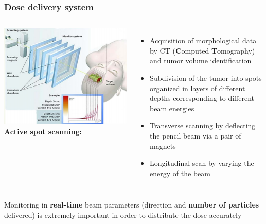 \documentclass[aspectratio=169]{beamer}
\begin{document}
	\begin{frame}
		\frametitle{Dose delivery system}
		\begin{columns}
			\includegraphics[width=0.95 \textwidth]{IMG/Beam_Monitoring.PNG}
			{\color{blue} \textbf{Active spot scanning:}}
			\begin{itemize}
				\item Acquisition of morphological data by CT (\textbf{C}omputed \textbf{T}omography) and tumor volume identification
				\item Subdivision of the tumor into spots organized in layers of different depths corresponding to different beam energies
				\item Transverse scanning by deflecting the pencil beam via a pair of magnets
				\item Longitudinal scan by varying the energy of the beam
			\end{itemize}
		\end{columns}
	\vspace{0.5 cm}
	{\color{blue} Monitoring in \textbf{real-time} beam parameters (direction and \textbf{number of particles} delivered) \newline is extremely important in order to distribute the dose accurately}
	\end{frame}
\end{document}
